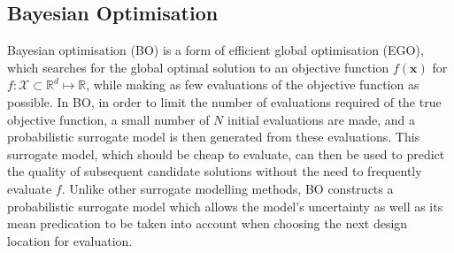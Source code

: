 \documentclass[conference]{IEEEtran}
\newcommand{\algremark}[1]{\tcc*[r]{#1}}
\newcommand{\ninitialevaluations}{N}
\newcommand{\nbudget}{B}
\newcommand{\parameterspace}{\mathcal{X}}
\newcommand{\ndim}{d}
\DeclareMathOperator*{\argmax}{\arg\!\max}
\DeclareMathOperator*{\argmin}{\arg\!\min}
\newcommand{\bx}{\mathbf{x}}
\newcommand{\data}{\mathcal{D}}
\begin{document}
\subsection{Bayesian Optimisation}\label{section:background_BayesianOptimisation}
Bayesian optimisation (BO) is a form of efficient global optimisation (EGO), which searches for the global optimal solution to an objective function $f(\mathbf{x})$ for  $f: \parameterspace \subset \mathbb{R}^{\ndim} \mapsto \mathbb{R}$, while making as few evaluations of the objective function as possible. In BO, in order to limit the number of evaluations required of the true objective function,  a small number of $\ninitialevaluations$ initial evaluations are made, and a probabilistic surrogate model is then generated from these evaluations. This surrogate model, which should be cheap to evaluate, can then be used to predict the quality of subsequent candidate solutions without the need to frequently evaluate $f$.   Unlike other surrogate modelling methods, BO constructs a probabilistic surrogate model which allows the model's uncertainty as well as its mean predication to be taken into account when choosing the next design location for evaluation.


\end{document}
